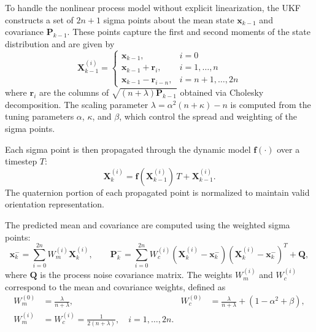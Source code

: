 To handle the nonlinear process model without explicit linearization, the UKF constructs a set of $2n+1$ sigma points about the mean state $\bm{x}_{k-1}$ and covariance $\bm{P}_{k-1}$. These points capture the first and second moments of the state distribution and are given by
\begin{equation}
    \bm{X}_{k-1}^{(i)} =
    \begin{cases}
        \bm{x}_{k-1}, & i = 0 \\[3pt]
        \bm{x}_{k-1} + \bm{r}_i, & i = 1,\dots,n\\[3pt]
        \bm{x}_{k-1} - \bm{r}_{i-n}, & i = n+1,\dots,2n
    \end{cases}
\end{equation}
where $\bm{r}_i$ are the columns of $\sqrt{(n+\lambda)\bm{P}_{k-1}}$ obtained via Cholesky decomposition. The scaling parameter $\lambda = \alpha^2(n+\kappa) - n$ is computed from the tuning parameters $\alpha$, $\kappa$, and $\beta$, which control the spread and weighting of the sigma points.

Each sigma point is then propagated through the dynamic model $\bm{f}(\cdot)$ over a timestep $T$:
\begin{equation}
    \bm{X}_k^{(i)} = \bm{f}(\bm{X}_{k-1}^{(i)})\,T + \bm{X}_{k-1}^{(i)}.
\end{equation}
The quaternion portion of each propagated point is normalized to maintain valid orientation representation.

The predicted mean and covariance are computed using the weighted sigma points:
\begin{equation}
    \bm{x}_k^- = \sum_{i=0}^{2n} W_m^{(i)} \bm{X}_k^{(i)}, \qquad
    \bm{P}_k^- = \sum_{i=0}^{2n} W_c^{(i)}(\bm{X}_k^{(i)} - \bm{x}_k^-)(\bm{X}_k^{(i)} - \bm{x}_k^-)^T + \bm{Q},
\end{equation}
where $\bm{Q}$ is the process noise covariance matrix. The weights $W_m^{(i)}$ and $W_c^{(i)}$ correspond to the mean and covariance weights, defined as
\begin{align}
    W_m^{(0)} &= \frac{\lambda}{n+\lambda}, &
    W_c^{(0)} &= \frac{\lambda}{n+\lambda} + (1-\alpha^2+\beta),\\
    W_m^{(i)} &= W_c^{(i)} = \frac{1}{2(n+\lambda)}, \quad i=1,\dots,2n.
\end{align}


